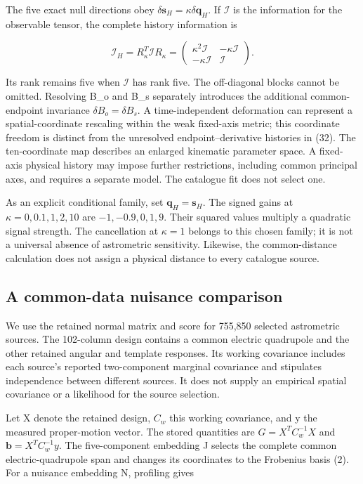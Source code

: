 The five exact null directions obey \(\delta\boldsymbol s_H=\kappa\delta\boldsymbol q_H\). If \(\mathcal I\) is the information for the observable tensor, the complete history information is

\[
\mathcal I_H=R_\kappa^T\mathcal I R_\kappa
=\begin{pmatrix}\kappa^2\mathcal I&-\kappa\mathcal I\\
-\kappa\mathcal I&\mathcal I\end{pmatrix}.
\tag{33}
\]

Its rank remains five when \(\mathcal I\) has rank five. The off-diagonal blocks cannot be omitted. Resolving B\_o and B\_s separately introduces the additional common-endpoint invariance \(\delta B_o=\delta B_s\). A time-independent deformation can represent a spatial-coordinate rescaling within the weak fixed-axis metric; this coordinate freedom is distinct from the unresolved endpoint--derivative histories in (32). The ten-coordinate map describes an enlarged kinematic parameter space. A fixed-axis physical history may impose further restrictions, including common principal axes, and requires a separate model. The catalogue fit does not select one.

As an explicit conditional family, set \(\boldsymbol q_H=\boldsymbol s_H\). The signed gains at \(\kappa=0,0.1,1,2,10\) are \(-1,-0.9,0,1,9\). Their squared values multiply a quadratic signal strength. The cancellation at \(\kappa=1\) belongs to this chosen family; it is not a universal absence of astrometric sensitivity. Likewise, the common-distance calculation does not assign a physical distance to every catalogue source.

\hypertarget{a-common-data-nuisance-comparison}{%
\subsection{A common-data nuisance comparison}\label{a-common-data-nuisance-comparison}}

We use the retained normal matrix and score for 755,850 selected astrometric sources. The 102-column design contains a common electric quadrupole and the other retained angular and template responses. Its working covariance includes each source's reported two-component marginal covariance and stipulates independence between different sources. It does not supply an empirical spatial covariance or a likelihood for the source selection.

Let X denote the retained design, \(C_w\) this working covariance, and y the measured proper-motion vector. The stored quantities are \(G=X^TC_w^{-1}X\) and \(\boldsymbol b=X^TC_w^{-1}y\). The five-component embedding J selects the complete common electric-quadrupole span and changes its coordinates to the Frobenius basis (2). For a nuisance embedding N, profiling gives

